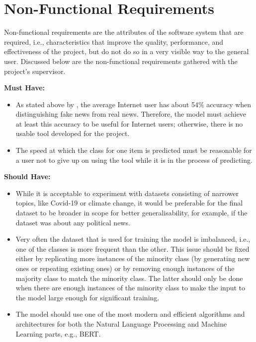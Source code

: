 \documentclass{l4proj}
\begin{document}
\section{Non-Functional Requirements}
\label{sec:non-func_reqs}

Non-functional requirements are the attributes of the software system that are required, i.e., characteristics that improve the quality, performance, and effectiveness of the project, but do not do so in a very visible way to the general user. Discussed below are the non-functional requirements gathered with the project's supervisor.

\textbf{Must Have:}
\begin{itemize}
    \item As stated above by \citet{FakeNewsTrends}, the average Internet user has about 54\% accuracy when distinguishing fake news from real news. Therefore, the model must achieve at least this accuracy to be useful for Internet users; otherwise, there is no usable tool developed for the project.
    \item The speed at which the class for one item is predicted must be reasonable for a user not to give up on using the tool while it is in the process of predicting. 
\end{itemize}

\textbf{Should Have:}
\begin{itemize}
    \item While it is acceptable to experiment with datasets consisting of narrower topics, like Covid-19 or climate change, it would be preferable for the final dataset to be broader in scope for better generalisability, for example, if the dataset was about any political news.
    \item Very often the dataset that is used for training the model is imbalanced, i.e., one of the classes is more frequent than the other. This issue should be fixed either by replicating more instances of the minority class (by generating new ones or repeating existing ones) or by removing enough instances of the majority class to match the minority class. The latter should only be done when there are enough instances of the minority class to make the input to the model large enough for significant training.
    \item The model should use one of the most modern and efficient algorithms and architectures for both the Natural Language Processing and Machine Learning parts, e.g., BERT.
\end{itemize}
\end{document}

